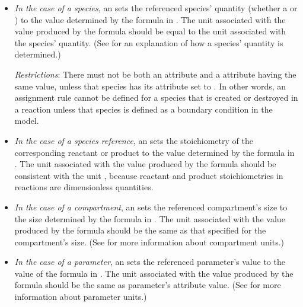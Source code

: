 \begin{itemize}
  
\item \emph{In the case of a species}, an \AssignmentRule sets the
  referenced species' quantity (whether a 
  or ) to the value determined by the formula in
  .  The unit associated with the value produced by
  the  formula should be equal to the unit associated
  with the species' quantity.  (See
   for an explanation of how a
  species' quantity is determined.)
  
  \emph{Restrictions}: There must not be both an \AssignmentRule
   attribute and a \SpeciesReference {}
  attribute having the same value, unless that species has its
   attribute set to .  In other
  words, an assignment rule cannot be defined for a species that
  is created or destroyed in a reaction unless that species is
  defined as a boundary condition in the model.

\item \emph{In the case of a species reference}, an
  \AssignmentRule sets the stoichiometry of the corresponding
  reactant or product to the value determined by the formula in
  .  The unit associated with the value produced by
  the  formula should be consistent with the unit
  , because reactant and product
  stoichiometries in reactions are dimensionless quantities.

\item \emph{In the case of a compartment}, an \AssignmentRule sets
  the referenced compartment's size to the size determined by the
  formula in .  The unit associated with the value
  produced by the  formula should be the same as that
  specified for the compartment's size.  (See
   for more information about
  compartment units.)
  
\item \emph{In the case of a parameter}, an \AssignmentRule sets
  the referenced parameter's value to the value of the formula in
  .  The unit associated with the value produced by
  the formula should be the same as parameter's 
  attribute value.  (See  for
  more information about parameter units.)


\end{itemize}



